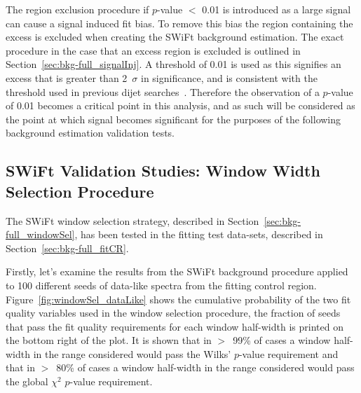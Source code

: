 The region exclusion procedure if \bh{} \mbox{$p$-value} $<$ 0.01 is introduced as a large signal can cause a signal induced fit bias.
To remove this bias the region containing the excess is excluded when creating the SWiFt background estimation.
The exact procedure in the case that an excess region is excluded is outlined in Section~\ref{sec:bkg-full_signalInj}.
A threshold of 0.01 is used as this signifies an excess that is greater than 2~$\sigma$ in significance,
and is consistent with the threshold used in previous dijet searches~\cite{det-thesis_kate}.
Therefore the observation of a \bh{} \mbox{$p$-value} of 0.01 becomes a critical point in this analysis,
and as such will be considered as the point at which signal becomes significant for the purposes of the following background estimation validation tests.



\subsection{SWiFt Validation Studies: Window Width Selection Procedure}
\label{sec:bkg-full_windowSelTests} 

The SWiFt window selection strategy, described in Section~\ref{sec:bkg-full_windowSel}, has been tested in the fitting test data-sets, described in Section~\ref{sec:bkg-full_fitCR}.


Firstly, let's examine the results from the SWiFt background procedure applied to 100 different seeds of data-like spectra from the fitting control region.
Figure~\ref{fig:windowSel_dataLike} shows the cumulative probability of the two fit quality variables used in the window selection procedure,
the fraction of seeds that pass the fit quality requirements for each window half-width is printed on the bottom right of the plot.
It is shown that in $>$~99\% of cases a window half-width in the range considered would pass the Wilks' \mbox{$p$-value} requirement
and that in $>$~80\% of cases a window half-width in the range considered would pass the global $\chi^{2}$ \mbox{$p$-value} requirement.

